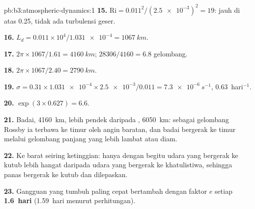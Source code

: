 \begin{solution}{pb:b3:atmospheric-dynamics:1}
\textbf{15.} $\mathrm{Ri} = 0.011^2/(\num{2.5e-3})^2 = 19$: jauh di atas 0.25,
tidak ada turbulensi geser.

\textbf{16.} $L_d = 0.011\times10^4/\num{1.031e-4} = \qty{1067}{km}$.

\textbf{17.} $2\pi\times1067/1.61 = \qty{4160}{km}$; $28306/4160 = 6.8$
gelombang.

\textbf{18.} $2\pi\times1067/2.40 = \qty{2790}{km}$.

\textbf{19.} $\sigma = 0.31\times\num{1.031e-4}\times\num{2.5e-3}/0.011 =
\qty{7.3e-6}{s^{-1}}$, \num{0.63}~hari$^{-1}$.

\textbf{20.} $\exp(3\times0.627) = 6.6$.

\textbf{21.} Badai, \qty{4160}{km}, lebih pendek daripada
, \qty{6050}{km}: sebagai gelombang Rossby ia terbawa ke timur
oleh angin baratan, dan badai bergerak ke timur melalui gelombang panjang yang
lebih lambat atau diam.

\textbf{22.} Ke barat seiring ketinggian: hanya dengan begitu udara yang bergerak
ke kutub lebih hangat daripada udara yang bergerak ke khatulistiwa, sehingga panas
bergerak ke kutub dan  dilepaskan.

\textbf{23.} Gangguan yang tumbuh paling cepat bertambah dengan faktor $e$ setiap
\textbf{\num[text-series-to-math=true]{1.6}~hari} (\num{1.59}~hari menurut
perhitungan).
\end{solution}
